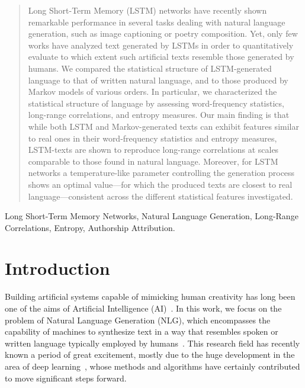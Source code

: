 \documentclass[journal]{IEEEtran}
\begin{document}
\maketitle
\thispagestyle{firstpage}

\begin{abstract}
Long Short-Term Memory (LSTM) networks have recently shown remarkable
performance in several tasks dealing with natural language generation, such as
image captioning or poetry composition. Yet, only few works
have analyzed text generated by LSTMs in order to quantitatively evaluate to
which extent such artificial texts resemble those generated by humans. We
compared the statistical structure of LSTM-generated language to that of written natural language,
and to those produced by Markov models of various orders. In particular, we characterized the statistical
structure of language by assessing word-frequency statistics, long-range correlations,
and entropy measures. Our main finding is that while both LSTM and Markov-generated
texts can exhibit features similar
to real ones in their word-frequency statistics and entropy measures,
LSTM-texts are shown to reproduce long-range correlations at scales comparable
to those found in natural language.
Moreover, for LSTM networks a temperature-like parameter controlling the generation process shows an optimal value---for which the produced texts are closest to real language---consistent across the different statistical features investigated.
\end{abstract}


\begin{IEEEkeywords}
Long Short-Term Memory Networks, Natural Language Generation, Long-Range Correlations, Entropy, Authorship Attribution.
\end{IEEEkeywords}


\section{Introduction}
\label{sec:introduction}

Building artificial systems capable of mimicking human creativity has long been one of the aims of Artificial Intelligence (AI)~\cite{Boden1998}. In this work, we focus on the problem of Natural Language Generation (NLG), which encompasses the capability of machines to synthesize text in a way that resembles spoken or written language typically employed by humans~\cite{Reiter2000}.
%
This research field has recently known a period of great excitement, mostly due to the huge development in the area of deep learning~\cite{LeCun2015}, whose methods and algorithms have certainly contributed to move significant steps forward.
\end{document}
